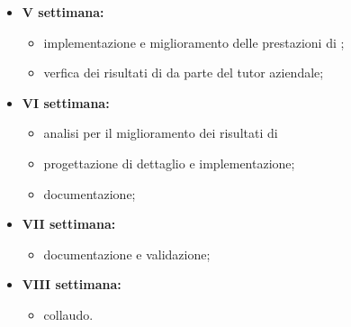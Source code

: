 \begin{itemize}
    \item \textbf{V settimana:}
    \begin{itemize}
        \item implementazione e miglioramento delle prestazioni di \emph{\app{}};
        \item verfica dei risultati di \emph{\app{}} da parte del tutor aziendale;
    \end{itemize}
    \item \textbf{VI settimana:}
    \begin{itemize}
        \item analisi per il miglioramento dei risultati di \emph{\app{}}
        \item progettazione di dettaglio e implementazione;
        \item documentazione;
    \end{itemize}
    \item \textbf{VII settimana:}
    \begin{itemize}
        \item documentazione e validazione;
    \end{itemize}
    \item \textbf{VIII settimana:}
    \begin{itemize}
        \item collaudo.
    \end{itemize}
\end{itemize}
